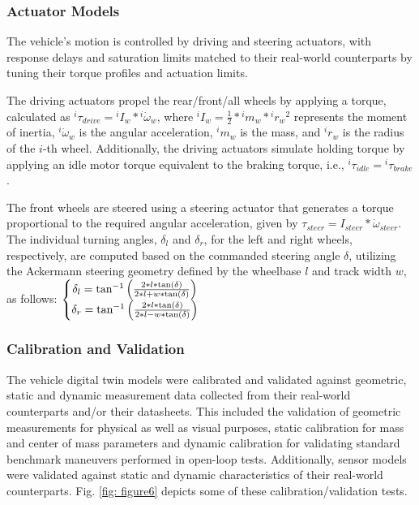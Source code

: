 \subsubsection{Actuator Models}
\label{Sub-Section: Actuator Models}

The vehicle's motion is controlled by driving and steering actuators, with response delays and saturation limits matched to their real-world counterparts by tuning their torque profiles and actuation limits.

The driving actuators propel the rear/front/all wheels by applying a torque, calculated as ${^i\tau_{drive}} = {^iI_w}*{^i\dot{\omega}_w}$, where ${^iI_w} = \frac{1}{2}*{^im_w}*{^i{r_w}^2}$ represents the moment of inertia, $^i\dot{\omega}_w$ is the angular acceleration, $^im_w$ is the mass, and $^ir_w$ is the radius of the $i$-th wheel. Additionally, the driving actuators simulate holding torque by applying an idle motor torque equivalent to the braking torque, i.e., ${^i\tau_{idle}} = {^i\tau_{brake}}$.

The front wheels are steered using a steering actuator that generates a torque proportional to the required angular acceleration, given by $\tau_{steer} = I_{steer}*\dot{\omega}_{steer}$. The individual turning angles, $\delta_l$ and $\delta_r$, for the left and right wheels, respectively, are computed based on the commanded steering angle $\delta$, utilizing the Ackermann steering geometry defined by the wheelbase $l$ and track width $w$, as follows: $\left\{\begin{matrix} \delta_l = \textup{tan}^{-1}\left(\frac{2*l*\textup{tan}(\delta)}{2*l+w*\textup{tan}(\delta)}\right) \\ \delta_r = \textup{tan}^{-1}\left(\frac{2*l*\textup{tan}(\delta)}{2*l-w*\textup{tan}(\delta)}\right) \end{matrix}\right.$

\subsubsection{Calibration and Validation}
\label{Sub-Section: Calibration and Validation}

The vehicle digital twin models were calibrated and validated against geometric, static and dynamic measurement data collected from their real-world counterparts and/or their datasheets. This included the validation of geometric measurements for physical as well as visual purposes, static calibration for mass and center of mass parameters and dynamic calibration for validating standard benchmark maneuvers performed in open-loop tests. Additionally, sensor models were validated against static and dynamic characteristics of their real-world counterparts. Fig. \ref{fig: figure6} depicts some of these calibration/validation tests.

